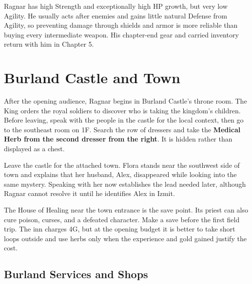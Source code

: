 \documentclass[
  american,
  10pt,
  letterpaper,
  oneside,
  open=any]{scrreprt}
\begin{document}
Ragnar has high Strength and exceptionally high HP growth, but very low
Agility. He usually acts after enemies and gains little natural Defense
from Agility, so preventing damage through shields and armor is more
reliable than buying every intermediate weapon. His chapter-end gear and
carried inventory return with him in Chapter 5.

\section{Burland Castle and Town}\label{burland-castle-and-town}

After the opening audience, Ragnar begins in Burland Castle's throne
room. The King orders the royal soldiers to discover who is taking the
kingdom's children. Before leaving, speak with the people in the castle
for the local context, then go to the southeast room on 1F. Search the
row of dressers and take the \textbf{Medical Herb from the second
dresser from the right}. It is hidden rather than displayed as a chest.

Leave the castle for the attached town. Flora stands near the southwest
side of town and explains that her husband, Alex, disappeared while
looking into the same mystery. Speaking with her now establishes the
lead needed later, although Ragnar cannot resolve it until he identifies
Alex in Izmit.

The House of Healing near the town entrance is the save point. Its
priest can also cure poison, curses, and a defeated character. Make a
save before the first field trip. The inn charges 4G, but at the opening
budget it is better to take short loops outside and use herbs only when
the experience and gold gained justify the cost.

\subsection{Burland Services and
Shops}\label{burland-services-and-shops}
\end{document}

